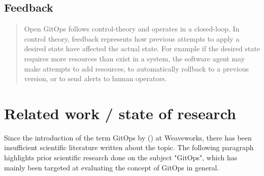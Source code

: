 \subsection*{Feedback}
\begin{quotation}
\noindent
Open GitOps follows control-theory and operates in a closed-loop. In control theory, feedback represents how previous attempts to apply a desired state have affected the actual state. For example if the desired state requires more resources than exist in a system, the software agent may make attempts to add resources, to automatically rollback to a previous version, or to send alerts to human operators.
\autocite{gitopsGlossary}
\end{quotation}











\section{Related work / state of research}


Since the introduction of the term GitOps by
\citeauthor{gitopsOperationsByPullRequest2017Weaveworks} (\citeyear{gitopsOperationsByPullRequest2017Weaveworks})
at Weaveworks,
there has been
insufficient
scientific literature written about the topic.
The following paragraph highlights prior 
scientific research done on the subject "GitOps",
which has mainly been targeted at
evaluating the concept of GitOps in general.
\bigskip


